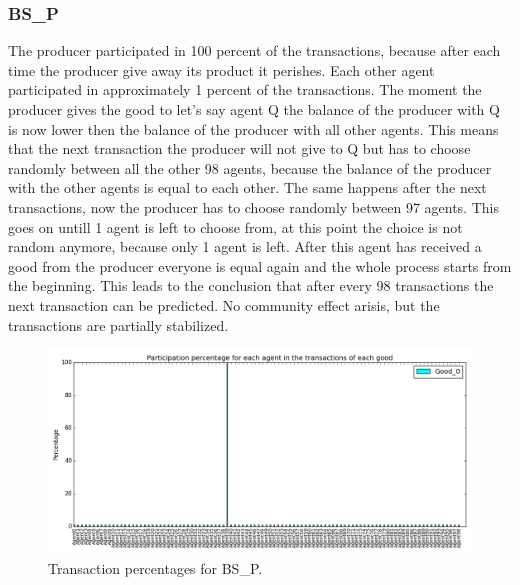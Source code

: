 \documentclass[twoside,openright]{uva-bachelor-thesis}
\begin{document}
\subsubsection{BS\_P}
The producer participated in 100 percent of the transactions, because after each time the producer give away its product it perishes. Each other agent participated in approximately 1 percent of the transactions. The moment the producer gives the good to let's say agent Q the balance of the producer with Q is now lower then the balance of the producer with all other agents. This means that the next transaction the producer will not give to Q but has to choose randomly between all the other 98 agents, because the balance of the producer with the other agents is equal to each other. The same happens after the next transactions, now the producer has to choose randomly between 97 agents. This goes on untill 1 agent is left to choose from, at this point the choice is not random anymore, because only 1 agent is left. After this agent has received a good from the producer everyone is equal again and the whole process starts from the beginning. This leads to the conclusion that after every 98 transactions the next transaction can be predicted.  No community effect arisis, but the transactions are partially stabilized. \\
\begin{figure}[h!]
  \centering
    \includegraphics[scale=0.4]{Simulation_figures/BR_BS_P/Figure1_10k} 
  \caption{Transaction percentages for BS\_P.}
\end{figure}
\end{document}
